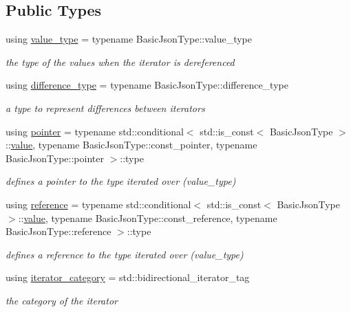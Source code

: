 \subsection*{Public Types}
\begin{DoxyCompactItemize}
\item 
using \hyperlink{classnlohmann_1_1detail_1_1iter__impl_ab35586a44f2222272c5346baa3013f67}{value\+\_\+type} = typename Basic\+Json\+Type\+::value\+\_\+type
\begin{DoxyCompactList}\small\item\em the type of the values when the iterator is dereferenced \end{DoxyCompactList}\item 
using \hyperlink{classnlohmann_1_1detail_1_1iter__impl_a2f7ea9f7022850809c60fc3263775840}{difference\+\_\+type} = typename Basic\+Json\+Type\+::difference\+\_\+type
\begin{DoxyCompactList}\small\item\em a type to represent differences between iterators \end{DoxyCompactList}\item 
using \hyperlink{classnlohmann_1_1detail_1_1iter__impl_a69e52f890ce8c556fd68ce109e24b360}{pointer} = typename std\+::conditional$<$ std\+::is\+\_\+const$<$ Basic\+Json\+Type $>$\+::\hyperlink{classnlohmann_1_1detail_1_1iter__impl_adc4048d25e057ce8ec0b912642c24731}{value}, typename Basic\+Json\+Type\+::const\+\_\+pointer, typename Basic\+Json\+Type\+::pointer $>$\+::type
\begin{DoxyCompactList}\small\item\em defines a pointer to the type iterated over (value\+\_\+type) \end{DoxyCompactList}\item 
using \hyperlink{classnlohmann_1_1detail_1_1iter__impl_a5be8001be099c6b82310f4d387b953ce}{reference} = typename std\+::conditional$<$ std\+::is\+\_\+const$<$ Basic\+Json\+Type $>$\+::\hyperlink{classnlohmann_1_1detail_1_1iter__impl_adc4048d25e057ce8ec0b912642c24731}{value}, typename Basic\+Json\+Type\+::const\+\_\+reference, typename Basic\+Json\+Type\+::reference $>$\+::type
\begin{DoxyCompactList}\small\item\em defines a reference to the type iterated over (value\+\_\+type) \end{DoxyCompactList}\item 
using \hyperlink{classnlohmann_1_1detail_1_1iter__impl_ad9e091f5c70b34b5b1abc1ab15fd9106}{iterator\+\_\+category} = std\+::bidirectional\+\_\+iterator\+\_\+tag
\begin{DoxyCompactList}\small\item\em the category of the iterator \end{DoxyCompactList}\end{DoxyCompactItemize}
